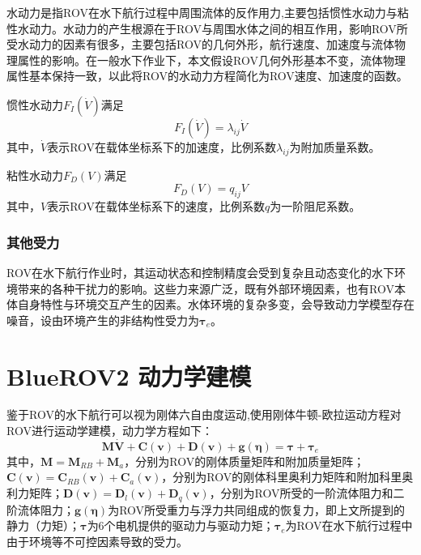 水动力是指ROV在水下航行过程中周围流体的反作用力,主要包括惯性水动力与粘性水动力。水动力的产生根源在于ROV与周围水体之间的相互作用，影响ROV所受水动力的因素有很多，主要包括ROV的几何外形，航行速度、加速度与流体物理属性的影响。在一般水下作业下，本文假设ROV几何外形基本不变，流体物理属性基本保持一致，以此将ROV的水动力方程简化为ROV速度、加速度的函数。

惯性水动力$F_I(\dot{V})$满足
\begin{equation}
    F_I(\dot{V})=\lambda_{ij}\dot{V}
\end{equation}
其中，$\dot{V}$表示ROV在载体坐标系下的加速度，比例系数$\lambda_{ij}$为附加质量系数。

粘性水动力$F_D(V)$满足
\begin{equation}
    F_D(V) = q_{ij}V
\end{equation}
其中，$V$表示ROV在载体坐标系下的速度，比例系数$q$为一阶阻尼系数。

\subsubsection{其他受力}

ROV在水下航行作业时，其运动状态和控制精度会受到复杂且动态变化的水下环境带来的各种干扰力的影响。这些力来源广泛，既有外部环境因素，也有ROV本体自身特性与环境交互产生的因素。水体环境的复杂多变，会导致动力学模型存在噪音，设由环境产生的非结构性受力为$\symbf{\tau}_e$。

\section{BlueROV2 动力学建模}

鉴于ROV的水下航行可以视为刚体六自由度运动,使用刚体牛顿-欧拉运动方程对ROV进行运动学建模，动力学方程如下：
\begin{equation}
    \symbf{M}\dot{\symbf{V}}+\symbf{C}(\symbf{v})+\symbf{D}(\symbf{v})+\symbf{g}(\symbf{\eta}) = \symbf{\tau} + \symbf{\tau}_e
\end{equation}
其中，$\symbf{M} = \symbf{M}_{RB}+\symbf{M}_a$，分别为ROV的刚体质量矩阵和附加质量矩阵；$\symbf{C}(\symbf{v})=\symbf{C}_{RB}(\symbf{v})+\symbf{C}_a(\symbf{v})$，分别为ROV的刚体科里奥利力矩阵和附加科里奥利力矩阵；$\symbf{D}(\symbf{v})=\symbf{D}_l(\symbf{v})+\symbf{D}_q(\symbf{v})$，分别为ROV所受的一阶流体阻力和二阶流体阻力；$\symbf{g}(\symbf{\eta})$为ROV所受重力与浮力共同组成的恢复力，即上文所提到的静力（力矩）；$\symbf{\tau}$为6个电机提供的驱动力与驱动力矩；$\symbf{\tau}_e$为ROV在水下航行过程中由于环境等不可控因素导致的受力。


